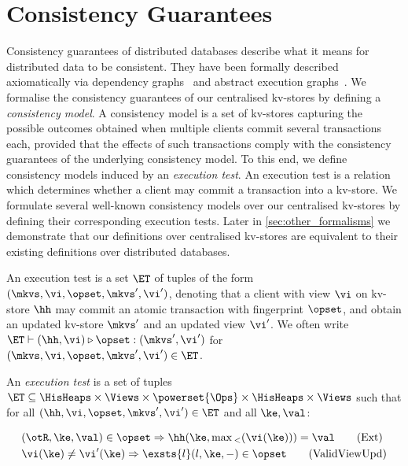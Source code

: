 \section{Consistency Guarantees}
\label{sec:cm}
Consistency guarantees of distributed databases describe
what it means for distributed data to be consistent. 
They have been formally described axiomatically via dependency graphs~\cite{adya-icde,adya}
and abstract execution graphs~\cite{ev_transactions,framework-concur}. 
We formalise the consistency guarantees of our centralised kv-stores by defining a 
\emph{consistency model}. 
A consistency model is a set of kv-stores capturing the possible outcomes 
obtained when multiple clients commit several transactions each, 
provided that the effects of such transactions comply with the consistency guarantees of the underlying consistency model. 
To this end, we define consistency models induced by an \emph{execution test}.
An execution test is a relation which determines whether a client may commit a transaction into a kv-store.  
We formulate several well-known consistency models over our centralised kv-stores 
by defining their corresponding execution tests. 
Later in \cref{sec:other_formalisms} we demonstrate that our definitions over centralised kv-stores are equivalent 
to their existing definitions over distributed databases.




An execution test is a set $\ET$ of tuples of the form $(\mkvs, \vi, \opset, \mkvs', \vi')$,
denoting that a client with view $\vi$ on kv-store $\hh$  may commit an atomic transaction 
with fingerprint $\opset$, and obtain an updated kv-store \( \mkvs' \) and an updated view $\vi'$. 
We often write
$\ET \vdash (\hh, \vi) \triangleright \opset: ( \mkvs', \vi')$ for
$(\mkvs, \vi, \opset, \mkvs', \vi') \in \ET$.


\begin{definition}
\label{def:execution.test}
An \emph{execution test} is a set of tuples $\ET \subseteq \HisHeaps \times \Views \times \powerset{\Ops} \times \HisHeaps \times \Views$ 
such that for all $(\hh, \vi, \opset, \mkvs', \vi') \in \ET$ and all $\ke, \val$:

\vspace*{-14pt}
{\small%
\begin{align}
    & 
	(\otR, \ke, \val) \in \opset \Rightarrow
	\hh(\ke, \max{}_{<}(\vi(\ke))) = \val  
	\tag{Ext} \label{eq:read-external} \\
    & 
    \vi(\ke) \neq \vi'(\ke) 
    \Rightarrow
    \exsts{l} (l, \ke, -) \in \opset
    \tag{ValidViewUpd} \label{eq:valid-view-update}
\end{align}%
}%
\end{definition}
\vspace*{-8pt}

